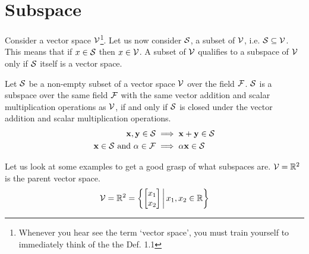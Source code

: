 \section{Subspace}
Consider a vector space $\mathcal{V}$\footnote{Whenever you hear see the term `vector space', you must train yourself to immediately think of the the Def. 1.1}. Let us now consider $\mathcal{S}$, a subset of $\mathcal{V}$, i.e. $\mathcal{S} \subseteq \mathcal{V}$. This means that if $x \in \mathcal{S}$ then $x \in \mathcal{V}$. A subset of $\mathcal{V}$ qualifies to a subspace of $\mathcal{V}$ only if $\mathcal{S}$ itself is a vector space.

\begin{definition}[frametitle=Subspace]
Let $\mathcal{S}$ be a non-empty subset of a vector space $\mathcal{V}$ over the field $\mathcal{F}$. $\mathcal{S}$ is a subspace over the same field $\mathcal{F}$ with the same vector addition and scalar multiplication operations as $\mathcal{V}$, if and only if $\mathcal{S}$ is closed under the vector addition and scalar multiplication operations.
\begin{align*}
\mathbf{x}, \mathbf{y} \in \mathcal{S} &\implies \mathbf{x} + \mathbf{y} \in \mathcal{S}\\
\mathbf{x} \in \mathcal{S} \text{ and } \alpha \in \mathcal{F} &\implies \alpha \mathbf{x} \in \mathcal{S}
\end{align*}
\end{definition}

Let us look at some examples to get a good grasp of what subspaces are. $\mathcal{V} = \mathbb{R}^2$ is the parent vector space. 
\[ \mc{V} = \mb{R}^2 = \lc \bmxc x_1 \\ x_2\emx \bigg\vert \, x_1, x_2 \in \mb{R} \rc\]

